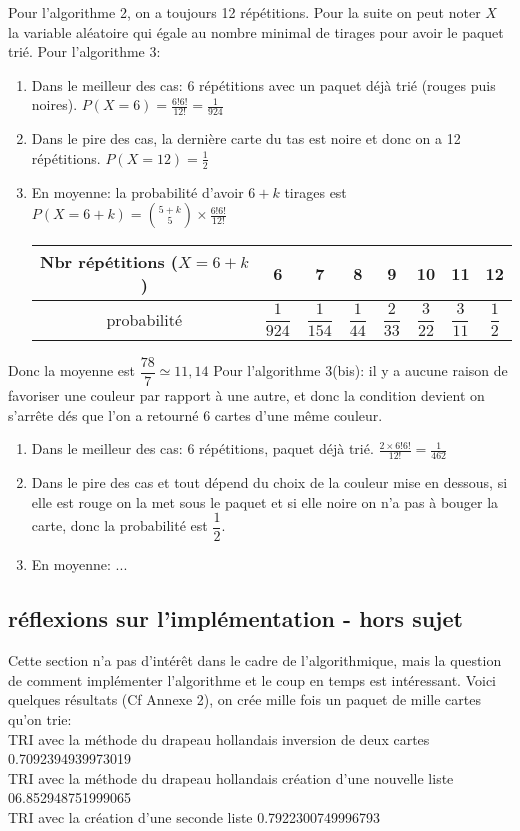 \documentclass[10pt,french]{article}
\theoremstyle{plain}
\begin{document}
Pour l'algorithme 2, on a toujours 12 répétitions.
\vskip 0.2cm
Pour la suite on peut noter $X$ la variable aléatoire qui égale au nombre minimal de tirages pour avoir le paquet trié.
Pour l'algorithme 3:
\begin{enumerate}
    \item Dans le meilleur des cas: 6 répétitions avec un paquet déjà trié (rouges puis noires). $P\left( X=6 \right)=\frac{6!6!}{12!}=\frac{1}{924} $
    \item Dans le pire des cas, la dernière carte du tas est noire et donc on a 12 répétitions.  $P\left( X=12 \right)=\frac{1}{2} $
\item En moyenne: la probabilité d'avoir $6+k$ tirages est $P\left( X=6+k \right)=\binom{5+k}{5}\times \frac{6!6!}{12!}$

   \renewcommand*{\arraystretch}{2}
    \begin{tabular}{|c|c|c|c|c|c|c|c|}
        \hline 
        Nbr répétitions ($X=6+k$)& 6&7  &8  &9  &10  &11  &12  \\ 
        \hline 
        probabilité &  $\dfrac{1}{924}$ & $\dfrac{1}{154}$ &$\dfrac{1}{44}$  &$\dfrac{2}{33}$  &$\dfrac{3}{22}$  &  $\dfrac{3}{11}$& $\dfrac{1}{2}$ \\ 
        \hline 
    \end{tabular} 
\end{enumerate}

Donc la moyenne est $\dfrac{78}{7} \simeq 11,14$
\vskip 0.2cm
Pour l'algorithme 3(bis):
il y a aucune raison de favoriser une couleur par rapport à une autre, et donc la condition devient on s'arrête dés que l'on a retourné 6 cartes d'une même couleur.
\begin{enumerate}
    \item Dans le meilleur des cas: 6 répétitions, paquet déjà trié. $ \frac{2\times6!6!}{12!}=\frac{1}{462} $
    \item Dans le pire des cas et tout dépend du choix de la couleur mise en dessous, si elle est rouge on la met sous le paquet et si elle noire on n'a pas à bouger la carte, donc la probabilité est $\dfrac{1}{2}$.
    \item En moyenne: ...
    
\end{enumerate}

\subsection{réflexions sur l'implémentation - hors sujet}
Cette section n'a pas d'intérêt dans le cadre de l'algorithmique, mais la question de comment implémenter l'algorithme et le coup en temps est intéressant.
Voici quelques 
résultats (Cf Annexe 2), on crée mille fois un paquet de mille cartes qu'on trie:\\
TRI avec la méthode du drapeau hollandais inversion de deux cartes  0.7092394939973019\\
TRI avec la méthode du drapeau hollandais création d'une nouvelle liste  06.852948751999065\\
TRI avec la création d'une seconde liste  0.7922300749996793

\newpage
{}
\scriptsize

    \inputminted{Python}{cartes.py}

\newpage
{}
        \inputminted{Python}{algo.py}
\end{document}
